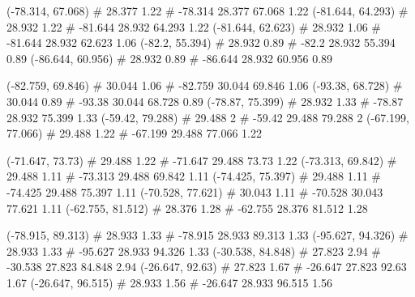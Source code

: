 \documentclass[a4paper,openbib,10pt]{article}
\newenvironment{treegraph}{\begin{graph}}{\end{graph}}
\begin{document}
\begin{treegraph}
  (-78.314, 67.068) #     28.377    1.22
   #    -78.314    28.377    67.068    1.22
  (-81.644, 64.293) #     28.932    1.22
   #    -81.644    28.932    64.293    1.22
  (-81.644, 62.623) #     28.932    1.06
   #    -81.644    28.932    62.623    1.06
  (-82.2, 55.394) #     28.932    0.89
   #    -82.2    28.932    55.394    0.89
  (-86.644, 60.956) #     28.932    0.89
   #    -86.644    28.932    60.956    0.89

  (-82.759, 69.846) #     30.044    1.06
   #    -82.759    30.044    69.846    1.06
  (-93.38, 68.728) #     30.044    0.89
   #    -93.38    30.044    68.728    0.89
  (-78.87, 75.399) #     28.932    1.33
   #    -78.87    28.932    75.399    1.33
  (-59.42, 79.288) #     29.488    2
   #    -59.42    29.488    79.288    2
  (-67.199, 77.066) #     29.488    1.22
   #    -67.199    29.488    77.066    1.22

  (-71.647, 73.73) #     29.488    1.22
   #    -71.647    29.488    73.73    1.22
  (-73.313, 69.842) #     29.488    1.11
   #    -73.313    29.488    69.842    1.11
  (-74.425, 75.397) #     29.488    1.11
   #    -74.425    29.488    75.397    1.11
  (-70.528, 77.621) #     30.043    1.11
   #    -70.528    30.043    77.621    1.11
  (-62.755, 81.512) #     28.376    1.28
   #    -62.755    28.376    81.512    1.28

  (-78.915, 89.313) #     28.933    1.33
   #    -78.915    28.933    89.313    1.33
  (-95.627, 94.326) #     28.933    1.33
   #    -95.627    28.933    94.326    1.33
  (-30.538, 84.848) #     27.823    2.94
   #    -30.538    27.823    84.848    2.94
  (-26.647, 92.63) #     27.823    1.67
   #    -26.647    27.823    92.63    1.67
  (-26.647, 96.515) #     28.933    1.56
   #    -26.647    28.933    96.515    1.56


\end{treegraph}
\end{document}
